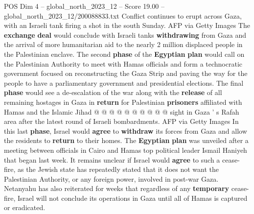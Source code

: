 \begin{textsample}{POS Dim 4 – global\_north\_2023\_12 – Score 19.00 – global\_north\_2023\_12/200088833.txt}
Conflict continues to erupt across Gaza, with an Israeli tank firing a shot in the south Sunday.
AFP via Getty Images The \textbf{exchange} \textbf{deal} would conclude with Israeli tanks \textbf{withdrawing} from Gaza and the arrival of more humanitarian aid to the nearly 2 million displaced people in the Palestinian enclave.
The second \textbf{phase} of the \textbf{Egyptian} \textbf{plan} would call on the Palestinian Authority to meet with Hamas officials and form a technocratic government focused on reconstructing the Gaza Strip and paving the way for the people to have a parliamentary government and presidential elections.
The final \textbf{phase} would see a de-escalation of the war along with the \textbf{release} of all remaining hostages in Gaza in \textbf{return} for Palestinian \textbf{prisoners} affiliated with Hamas and the Islamic Jihad @ @ @ @ @ @ @ @ @ @ sight in Gaza ' s Rafah area after the latest round of Israeli bombardments.
AFP via Getty Images In this last \textbf{phase}, Israel would \textbf{agree} to \textbf{withdraw} its forces from Gaza and allow the residents to \textbf{return} to their homes.
The \textbf{Egyptian} \textbf{plan} was unveiled after a meeting between officials in Cairo and Hamas top political leader Ismail Haniyeh that began last week.
It remains unclear if Israel would \textbf{agree} to such a cease-fire, as the Jewish state has repeatedly stated that it does not want the Palestinian Authority, or any foreign power, involved in post-war Gaza.
Netanyahu has also reiterated for weeks that regardless of any \textbf{temporary} cease-fire, Israel will not conclude its operations in Gaza until all of Hamas is captured or eradicated.

\end{textsample}
